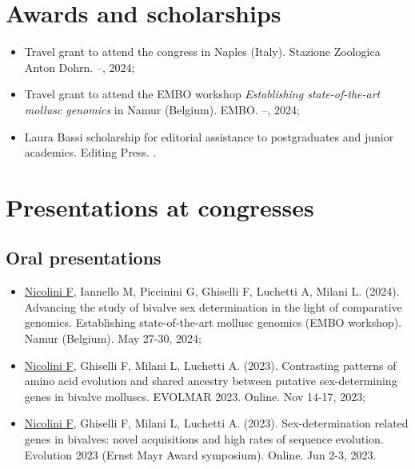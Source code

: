 \section*{Awards and scholarships}
\begin{itemize}
	\item Travel grant to attend the  congress in Naples (Italy). Stazione Zoologica Anton Dohrn.  --, 2024;
	\item Travel grant to attend the EMBO workshop \textit{Establishing state-of-the-art mollusc genomics} in Namur (Belgium). EMBO.  --, 2024;
	\item Laura Bassi scholarship for editorial assistance to postgraduates and junior academics. Editing Press. .
\end{itemize}

\section*{Presentations at congresses}
\subsection*{Oral presentations}
\begin{itemize}
	\item \underline{Nicolini F}, Iannello M, Piccinini G, Ghiselli F, Luchetti A, Milani L. (2024). Advancing the study of bivalve sex determination in the light of comparative genomics. Establishing state-of-the-art mollusc genomics (EMBO workshop). Namur (Belgium). May 27-30, 2024;
	\item \underline{Nicolini F}, Ghiselli F, Milani L, Luchetti A. (2023). Contrasting patterns of amino acid evolution and shared ancestry between putative sex-determining genes in bivalve molluscs. EVOLMAR 2023. Online. Nov 14-17, 2023;
	\item \underline{Nicolini F}, Ghiselli F, Milani L, Luchetti A. (2023). Sex-determination related genes in bivalves: novel acquisitions and high rates of sequence evolution. Evolution 2023 (Ernst Mayr Award symposium). Online. Jun 2-3, 2023.
\end{itemize}

